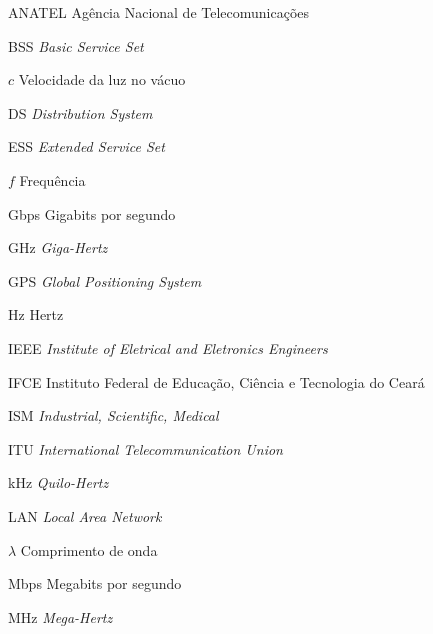 \begin{siglas} \itemsep -1pt	
	\item[ANATEL] \hspace{.8cm} Agência Nacional de Telecomunicações
	\item[BSS] \hspace{.8cm} \textit{Basic Service Set}
	\item[$c$] \hspace{.8cm} Velocidade da luz no vácuo
	\item[DS] \hspace{.8cm} \textit{Distribution System}
	\item[ESS] \hspace{.8cm} \textit{Extended Service Set}
	\item[$f$] \hspace{.8cm} Frequência
	\item[Gbps] \hspace{.8cm} Gigabits por segundo
	\item[GHz] \hspace{.8cm} \textit{Giga-Hertz}
	\item[GPS] \hspace{.8cm} \textit{Global Positioning System}
	\item[Hz] \hspace{.8cm} Hertz
	\item[IEEE] \hspace{.8cm} \textit{Institute of Eletrical and Eletronics Engineers}
	\item[IFCE] \hspace{.8cm} Instituto Federal de Educação, Ciência e Tecnologia do Ceará
	\item[ISM] \hspace{.8cm} \textit{Industrial, Scientific, Medical}
	\item[ITU] \hspace{.8cm} \textit{International Telecommunication Union}
	\item[kHz] \hspace{.8cm} \textit{Quilo-Hertz}
	\item[LAN] \hspace{.8cm} \textit{Local Area Network}
	\item[$\lambda$] \hspace{.8cm} Comprimento de onda
	\item[Mbps] \hspace{.8cm} Megabits por segundo
	\item[MHz] \hspace{.8cm} \textit{Mega-Hertz}

\end{siglas}
